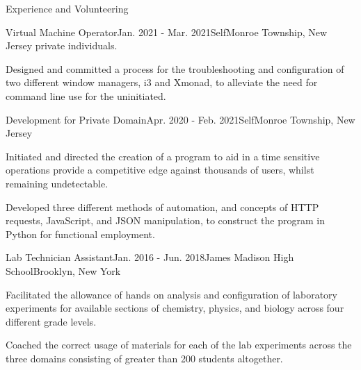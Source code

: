 \documentclass{resume}
\begin{document}
\begin{rSection}{Experience and Volunteering}
\begin{rSubsection}{Virtual Machine Operator}{Jan. 2021 - Mar. 2021}{Self}{Monroe Township, New Jersey}
                private individuals.
            \item Designed and committed a process for the troubleshooting and
                configuration of two different window managers, i3 and Xmonad,
                to alleviate the need for command line use for the uninitiated.
        \end{rSubsection}
        \begin{rSubsection}{Development for Private Domain}{Apr. 2020 - Feb. 2021}{Self}{Monroe Township, New Jersey}
            \item Initiated and directed the creation of a program to aid in a
                time sensitive operations provide a competitive edge against
                thousands of users, whilst remaining undetectable.
            \item Developed three different methods of automation, and
                concepts of HTTP requests, JavaScript, and JSON
                manipulation, to construct the program in Python for functional
                employment.
        \end{rSubsection}
        \begin{rSubsection}{Lab Technician Assistant}{Jan. 2016 - Jun. 2018}{James Madison High School}{Brooklyn, New York}
            \item Facilitated the allowance of hands on analysis and configuration
                of laboratory experiments for available sections of chemistry,
                physics, and biology across four different grade levels.
            \item Coached the correct usage of materials for each of the lab
                experiments across the three domains consisting of greater than
                200 students altogether.
        \end{rSubsection}
    \end{rSection}

\end{document}
